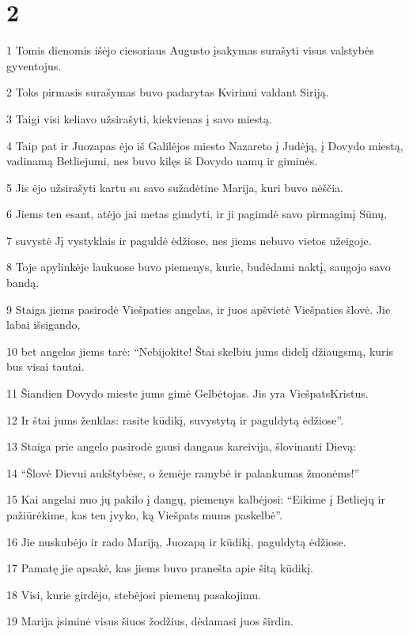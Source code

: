 \chapter{2}


\par 1 Tomis dienomis išėjo ciesoriaus Augusto įsakymas surašyti visus valstybės gyventojus. 
\par 2 Toks pirmasis surašymas buvo padarytas Kvirinui valdant Siriją. 
\par 3 Taigi visi keliavo užsirašyti, kiekvienas į savo miestą. 
\par 4 Taip pat ir Juozapas ėjo iš Galilėjos miesto Nazareto į Judėją, į Dovydo miestą, vadinamą Betliejumi, nes buvo kilęs iš Dovydo namų ir giminės. 
\par 5 Jis ėjo užsirašyti kartu su savo sužadėtine Marija, kuri buvo nėščia. 
\par 6 Jiems ten esant, atėjo jai metas gimdyti, ir ji pagimdė savo pirmagimį Sūnų, 
\par 7 suvystė Jį vystyklais ir paguldė ėdžiose, nes jiems nebuvo vietos užeigoje. 
\par 8 Toje apylinkėje laukuose buvo piemenys, kurie, budėdami naktį, saugojo savo bandą. 
\par 9 Staiga jiems pasirodė Viešpaties angelas, ir juos apšvietė Viešpaties šlovė. Jie labai išsigando, 
\par 10 bet angelas jiems tarė: “Nebijokite! Štai skelbiu jums didelį džiaugsmą, kuris bus visai tautai. 
\par 11 Šiandien Dovydo mieste jums gimė Gelbėtojas. Jis yra Viešpats­Kristus. 
\par 12 Ir štai jums ženklas: rasite kūdikį, suvystytą ir paguldytą ėdžiose”. 
\par 13 Staiga prie angelo pasirodė gausi dangaus kareivija, šlovinanti Dievą: 
\par 14 “Šlovė Dievui aukštybėse, o žemėje ramybė ir palankumas žmonėms!” 
\par 15 Kai angelai nuo jų pakilo į dangų, piemenys kalbėjosi: “Eikime į Betliejų ir pažiūrėkime, kas ten įvyko, ką Viešpats mums paskelbė”. 
\par 16 Jie nuskubėjo ir rado Mariją, Juozapą ir kūdikį, paguldytą ėdžiose. 
\par 17 Pamatę jie apsakė, kas jiems buvo pranešta apie šitą kūdikį. 
\par 18 Visi, kurie girdėjo, stebėjosi piemenų pasakojimu. 
\par 19 Marija įsiminė visus šiuos žodžius, dėdamasi juos širdin. 
